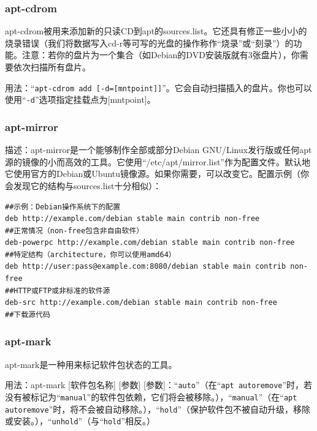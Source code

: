 \subsubsection{apt-cdrom}
\cite{manaptcd}\par
apt-cdrom被用来添加新的只读CD到apt的sources.list。它还具有修正一些小小的烧录错误（我们将数据写入cd-r等可写的光盘的操作称作“烧录”或“刻录”）的功能。注意：若你的盘片为一个集合（如Debian的DVD安装版就有3张盘片），你需要依次扫描所有盘片。\par
用法：“\verb|apt-cdrom add [-d=[mntpoint]]|”。它会自动扫描插入的盘片。你也可以使用“\verb|-d|”选项指定挂载点为[mntpoint]。\par
\subsubsection{apt-mirror}
描述：apt-mirror是一个能够制作全部或部分Debian GNU/Linux发行版或任何apt源的镜像的小而高效的工具。它使用“/etc/apt/mirror.list”作为配置文件。默认地它使用官方的Debian或Ubuntu镜像源。如果你需要，可以改变它。配置示例（你会发现它的结构与sources.list十分相似）：
\begin{verbatim}
##示例：Debian操作系统下的配置
deb http://example.com/debian stable main contrib non-free
##正常情况（non-free包含非自由软件）
deb-powerpc http://example.com/debian stable main contrib non-free
##特定结构（architecture，你可以使用amd64）
deb http://user:pass@example.com:8080/debian stable main contrib non-free
##HTTP或FTP或非标准的软件源
deb-src http://example.com/debian stable main contrib non-free
##下载源代码
\end{verbatim}
\subsubsection{apt-mark}
\cite{manaptmark}\par
apt-mark是一种用来标记软件包状态的工具。\par
用法：apt-mark [软件包名称] [参数]
[参数]：“\verb|auto|”（在“\verb|apt autoremove|”时，若没有被标记为“\verb|manual|”的软件包依赖，它们将会被移除。），“\verb|manual|”（在“\verb|apt autoremove|”时，将不会被自动移除。{\color{red}{这个命令可以防止“\verb|apt autoremove|”对系统造成不可逆的致命破坏。}}），“\verb|hold|”（保护软件包不被自动升级，移除或安装。），“\verb|unhold|”（与“\verb|hold|”相反。）
